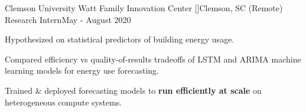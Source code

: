 \resumeSubheading
{Clemson University Watt Family Innovation Center [\href{https://www.clemson.edu/centers-institutes/watt/}{}]}{Clemson, SC (Remote)}
{Research Intern}{May - August 2020}
\resumeItemListStart
    \item Hypothesized on statistical predictors of building energy usage.
    \item Compared efficiency vs quality-of-results tradeoffs of LSTM and ARIMA machine learning models for energy use forecasting.
    \item Trained \& deployed forecasting models to \textbf{run efficiently at scale} on heterogeneous compute systems.
\resumeItemListEnd



\resumeSubHeadingListEnd
\vspace{-6mm}

